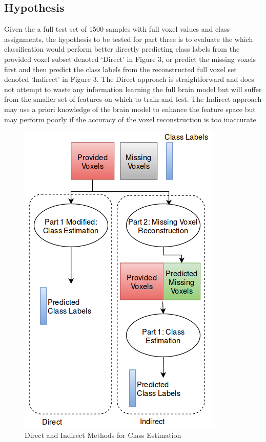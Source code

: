 \documentclass{article} %
\begin{document}
\subsection{Hypothesis}
Given the a full test set of 1500 samples with full voxel values and class assignments, the hypothesis to be tested for part three is to evaluate the which classification would perform better directly predicting class labels from the provided voxel subset denoted ‘Direct’ in Figure 3,  or predict the missing voxels first and then predict the class labels from the reconstructed full voxel set denoted ‘Indirect’ in Figure 3.  The Direct approach is straightforward and does not attempt to waste any information learning the full brain model but will suffer from the smaller set of features on which to train and test. The Indirect approach may use a priori knowledge of the brain model to enhance the feature space but may perform poorly if the accuracy of the voxel reconstruction is too inaccurate.

\begin{figure}
	\begin{center}
		\includegraphics[scale=.35]{media/take2.png}
	\end{center}
	\caption{Direct and Indirect Methods for Class Estimation}
	\vspace{-20pt}
\end{figure}
\end{document}
